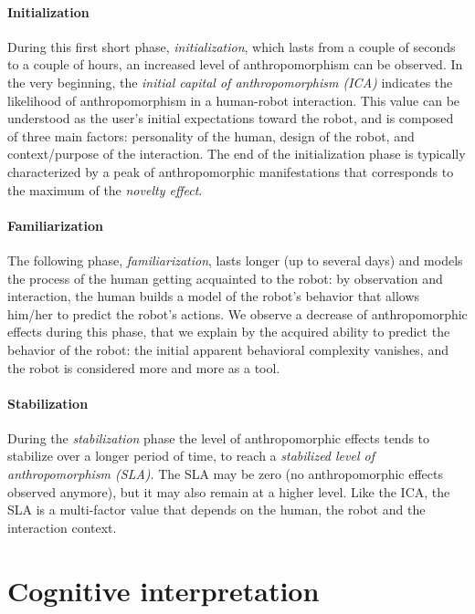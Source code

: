 \documentclass{sig-alternate-2013}
\begin{document}

\paragraph*{Initialization}
During this first short phase, \emph{initialization}, which lasts from a couple
of seconds to a couple of hours, an increased level of
anthropomorphism can be observed. In the very beginning, the \emph{initial capital of anthropomorphism (ICA)} indicates the likelihood of anthropomorphism in a human-robot interaction.
This value can be understood as the user's initial expectations toward the robot,
and is composed of three main factors: personality of the human, design of the
robot, and context/purpose of the interaction. 
The end of the initialization phase is typically
characterized by a peak of anthropomorphic manifestations that corresponds to the maximum of the \emph{novelty effect}.

\paragraph*{Familiarization}
The following phase, \emph{familiarization}, lasts longer (up to several days) and
models the process of the human getting acquainted to the robot: by observation
and interaction, the human builds a model of the robot's behavior that allows
him/her to predict the robot's actions. We observe a decrease of
anthropomorphic effects during this phase, that we explain by the acquired
ability to predict the behavior of the robot: the initial apparent behavioral
complexity vanishes, and the robot is considered more and more as a tool.

\paragraph*{Stabilization}
During the \emph{stabilization} phase the level of anthropomorphic effects tends to
stabilize over a longer period of time, to reach a \emph{stabilized
level of anthropomorphism (SLA)}. The SLA may be zero (no anthropomorphic
effects observed anymore), but it may also remain at a higher level. Like the
ICA, the SLA is a multi-factor value that depends on the human, the robot and
the interaction context.

\section{Cognitive interpretation}
\label{sec:cognitivemodel}
\end{document}
